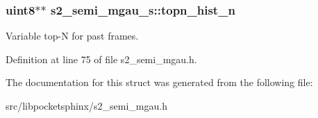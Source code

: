 \subsubsection[{topn\+\_\+hist\+\_\+n}]{\setlength{\rightskip}{0pt plus 5cm}uint8$\ast$$\ast$ s2\+\_\+semi\+\_\+mgau\+\_\+s\+::topn\+\_\+hist\+\_\+n}\label{structs2__semi__mgau__s_acfe1e5d43a25418ef19afba837f85cf7}


Variable top-\/\+N for past frames. 



Definition at line 75 of file s2\+\_\+semi\+\_\+mgau.\+h.



The documentation for this struct was generated from the following file\+:\begin{DoxyCompactItemize}
\item 
src/libpocketsphinx/s2\+\_\+semi\+\_\+mgau.\+h\end{DoxyCompactItemize}
